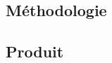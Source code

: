 
\subsection{Méthodologie}
\DylanSpeak
\begin{frame}
	
\end{frame}
\SteveSpeak
\begin{frame}
	
\end{frame}

\begin{frame}
	
\end{frame}

\ZacSpeak
\subsection{Produit}
\begin{frame}
	
\end{frame}

